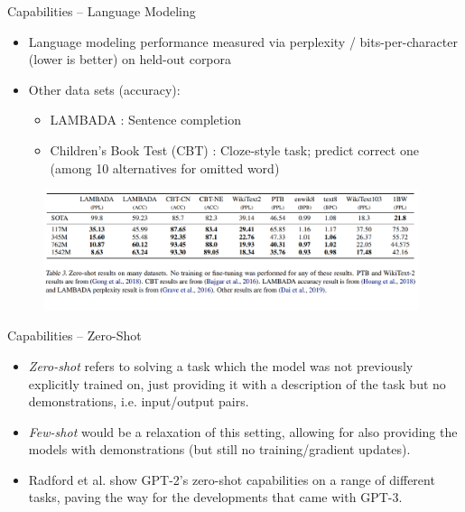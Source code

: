\begin{frame}{Capabilities -- Language Modeling}

\vfill

\begin{itemize}
	\item Language modeling performance measured via perplexity / bits-per-character (lower is better) on held-out corpora
	\item Other data sets (accuracy):
			\begin{itemize}
				\item LAMBADA : Sentence completion
				\item Children's Book Test (CBT) : Cloze-style task; predict correct one (among 10 alternatives for omitted word)
			\end{itemize}
\end{itemize}

\begin{figure}
\centering
\includegraphics[width = 11cm]{figure/72-gpt2-lm-zeroshot.png}\\ 
\end{figure}

\vfill

\end{frame}


\begin{frame}{Capabilities -- Zero-Shot}

\vfill

\begin{itemize}
	\item \textit{Zero-shot} refers to solving a task which the model was not previously explicitly trained on, just providing it with a description of the task but no demonstrations, i.e. input/output pairs.
	\item \textit{Few-shot} would be a relaxation of this setting, allowing for also providing the models with demonstrations (but still no training/gradient updates).
	\item Radford et al. show GPT-2's zero-shot capabilities on a range of different tasks, paving the way for the developments that came with GPT-3.
\end{itemize}

\vfill

\end{frame}

